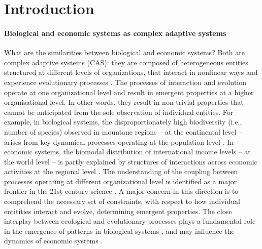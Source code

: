 %
\chapter{Introduction}
\label{sec:intro}


\subsubsection*{Biological and economic systems as complex adaptive systems}
What are the similarities between biological and economic systems? Both are complex adaptive systems (CAS): they are composed of heterogeneous entities structured at different levels of organizations, that interact in nonlinear ways and experience evolutionary processes \cite{Levin}. The processes of interaction and evolution operate at one organizational level and result in emergent properties at a higher organisational level. In other words, they result in non-trivial properties that cannot be anticipated from the sole observation of individual entities.
For example, in biological systems, the disproportionately high biodiversity (i.e., number of species) observed in mountane regions \cite{Rahbek2019} -- at the continental level -- arises from key dynamical processes operating at the population level \cite{Rangel2018}.
In economic systems, the biomodal distribution of international income levels -- at the world level -- is partly explained by structures of interactions across economic activities at the regional level \cite{C.A.HidalgoB.Klinger}.
The understanding of the coupling between processes operating at different organizational level is identified as a major frontier in the 21st century science \cite{Strogatz2001a}. A major concern in this direction is to comprehend the necessary set of constraints, with respect to how individual entitities interact and evolve, determining emergent properties. 
The close interplay between ecological and evolutionary processes plays a fundamental role in the emergence of patterns in biological systems \cite{Pelletier2009}, and may influence the dynamics of economic systems \cite{Hodgson2019}.

